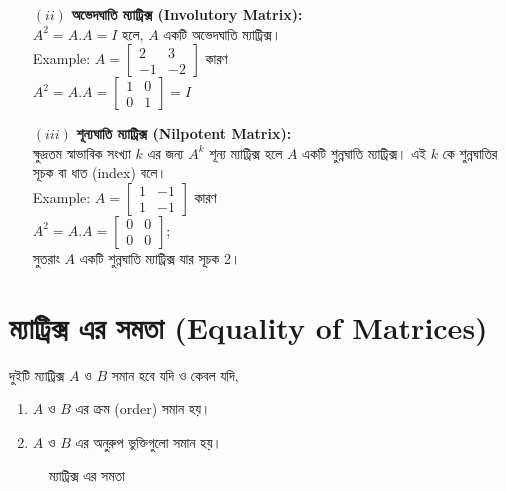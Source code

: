 \begin{enumerate}
\begin{itemize}
		\item[$(ii)$] \textbf{অভেদঘাতি ম্যাট্রিক্স (Involutory Matrix):}\\ $A^2=A.A=I$ হলে, $A$ একটি অভেদঘাতি ম্যাট্রিক্স। \\Example: $A=\left[\begin{array}{rr}
		2 & 3 \\
		-1 & -2
		\end{array}\right]$ কারণ \\
		$A^2=A.A=\left[\begin{array}{rr}
		1 & 0 \\
		0 & 1
		\end{array}\right]=I$
		
		\item[$(iii)$] \textbf{শূন্যঘাতি ম্যাট্রিক্স (Nilpotent Matrix):}\\ ক্ষুদ্রতম স্বাভাবিক সংখ্যা $k$ এর জন্য $A^k$ শূন্য ম্যাট্রিক্স হলে $A$ একটি শুন্নঘাতি ম্যাট্রিক্স। এই $k$ কে শুন্নঘাতির সূচক বা ধাত (index) বলে। \\ Example: $A=\left[\begin{array}{cc}
		1 & -1 \\
		1 & -1
		\end{array}\right]$ কারণ\\
		$A^2=A.A=\left[\begin{array}{cc}
		0 & 0 \\
		0 & 0
		\end{array}\right]$; \\ সুতরাং $A$ একটি শুন্নঘাতি ম্যাট্রিক্স যার সূচক 2।
	\end{itemize}  
\end{enumerate}
\section{ম্যাট্রিক্স এর সমতা (Equality of Matrices)}\label{section-3}
দুইটি ম্যাট্রিক্স $A$ ও $B$ সমান হবে যদি ও কেবল যদি,
\begin{enumerate}
	\item $A$ ও $B$ এর ক্রম (order) সমান হয়।
	\item $A$ ও $B$ এর অনুরুপ ভুক্তিগুলো সমান হয়।
\end{enumerate}
\begin{figure}[h]
	\centering
	
	\caption{ম্যাট্রিক্স এর সমতা}
	\label{mat-eq}
\end{figure}


